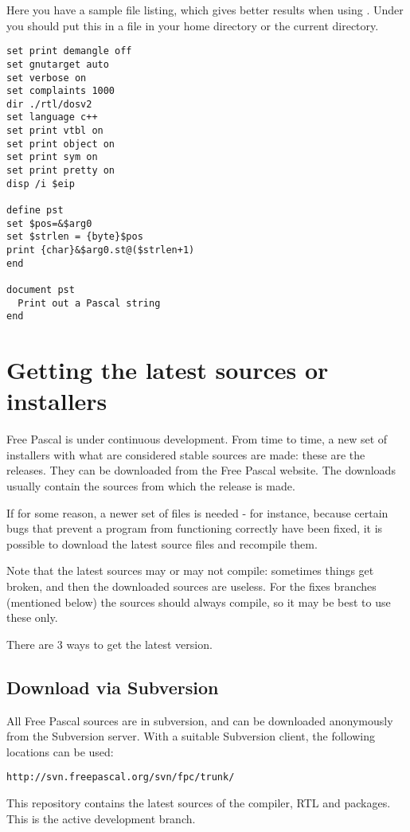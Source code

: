 Here you have a sample  file listing, which gives better
results when using . Under \linux you should put this in a
 file in your home directory or the current directory.

\begin{verbatim}
set print demangle off
set gnutarget auto
set verbose on
set complaints 1000
dir ./rtl/dosv2
set language c++
set print vtbl on
set print object on
set print sym on
set print pretty on
disp /i $eip

define pst
set $pos=&$arg0
set $strlen = {byte}$pos
print {char}&$arg0.st@($strlen+1)
end

document pst
  Print out a Pascal string
end
\end{verbatim}



\chapter{Getting the latest sources or installers}
\label{ch:sourcedownload}

Free Pascal is under continuous development. From time to time, a new
set of installers with what are considered stable sources are made: these
are the releases. They can be downloaded from the Free Pascal website.
The downloads usually contain the sources from which the release is made.

If for some reason, a newer set of files is needed - for instance, because
certain bugs that prevent a program from functioning correctly have been
fixed, it is possible to download the latest source files and recompile
them.

Note that the latest sources may or may not compile: sometimes things get
broken, and then the downloaded sources are useless. For the fixes branches
(mentioned below) the sources should always compile, so it may be best
to use these only.

There are 3 ways to get the latest version.

\section{Download via Subversion}
All Free Pascal sources are in subversion, and can be downloaded anonymously
from the Subversion server. With a suitable Subversion client, the following
locations can be used:
\begin{verbatim}
http://svn.freepascal.org/svn/fpc/trunk/
\end{verbatim}
This repository contains the latest sources of the compiler, RTL and packages. 
This is the active development branch.

